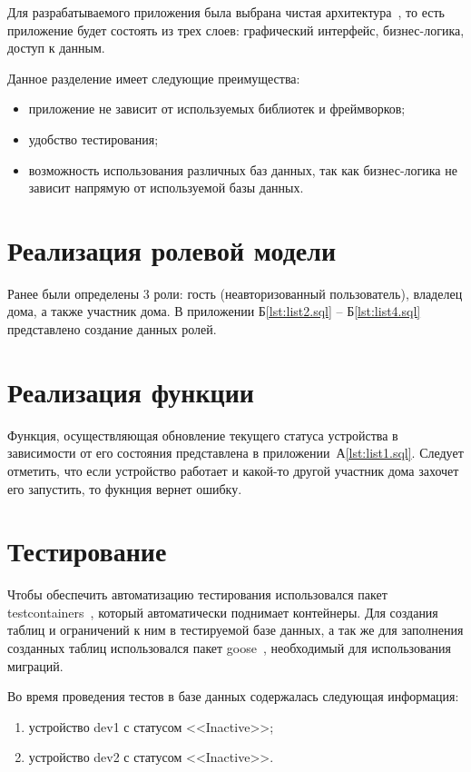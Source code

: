 Для разрабатываемого приложения была выбрана чистая архитектура~\cite{cleanArch}, то есть приложение будет 
состоять из трех слоев: графический интерфейс, бизнес-логика, доступ к данным.

Данное разделение имеет следующие преимущества:
\begin{itemize}
    \item приложение не зависит от используемых библиотек и фреймворков;
    \item удобство тестирования;
    \item возможность использования различных баз данных, так как
    бизнес-логика не зависит напрямую от используемой базы данных.
\end{itemize}

\section{Реализация ролевой модели}
Ранее были определены 3 роли: гость (неавторизованный пользователь), 
владелец дома, а также участник дома. 
В приложении Б\ref{lst:list2.sql} -- Б\ref{lst:list4.sql} представлено создание данных ролей.

\section{Реализация функции}

Функция, осуществляющая обновление текущего статуса 
устройства в зависимости от его состояния представлена 
в приложении~А\ref{lst:list1.sql}. Следует отметить, что если 
устройство работает и какой-то другой участник дома 
захочет его запустить, то фукнция вернет ошибку.  

\section{Тестирование}

Чтобы обеспечить автоматизацию тестирования
использовался пакет testcontainers~\cite{testcontainers}, который
автоматически поднимает контейнеры. Для создания таблиц 
и ограничений к ним в тестируемой базе данных, а так же
для заполнения созданных таблиц использовался пакет goose~\cite{goose}, 
необходимый для использования миграций.

Во время проведения тестов в базе данных содержалась 
следующая информация:

\begin{enumerate}
    \item устройство dev1 с статусом <<Inactive>>;
    \item устройство dev2 с статусом <<Inactive>>.
\end{enumerate}

